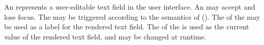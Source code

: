 An  represents a user-editable text field in the user interface. An  may accept and lose focus. The   may be triggered according to the semantics of  (). The  of the  may be used as a label for the rendered text field. The  of the  is used as the current value of the rendered text field, and may be changed at runtime.
